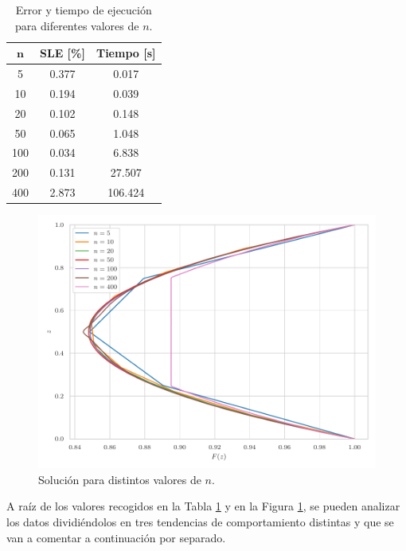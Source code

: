 \begin{table}[h]
    \centering
    \caption{Error y tiempo de ejecución para diferentes valores de $n$.}
    \begin{tabular}{c c c}
        \hline
        $\mathbf{n}$ & \textbf{SLE [\%]} & \textbf{Tiempo [s]} \\ \hline \hline
        5     & 0.377 &   0.017 \\ \hline
        10    & 0.194 &   0.039 \\ \hline
        20    & 0.102 &   0.148 \\ \hline
        50    & 0.065 &   1.048 \\ \hline
        100   & 0.034 &   6.838 \\ \hline
        200   & 0.131 &  27.507 \\ \hline
        400   & 2.873 & 106.424 \\ \hline
    \end{tabular}
    \label{tab:error_n}
\end{table}

\begin{figure}[h]
    \centering
    \includegraphics[width = 0.6 \linewidth]{Figures/01/sol_n.pdf}
    \caption{Solución para distintos valores de $n$.}
    \label{fig:sol_n}
\end{figure}

A raíz de los valores recogidos en la Tabla \ref{tab:error_n} y en la Figura \ref{fig:sol_n}, se pueden analizar los datos dividiéndolos en tres tendencias de comportamiento distintas y que se van a comentar a continuación por separado.

